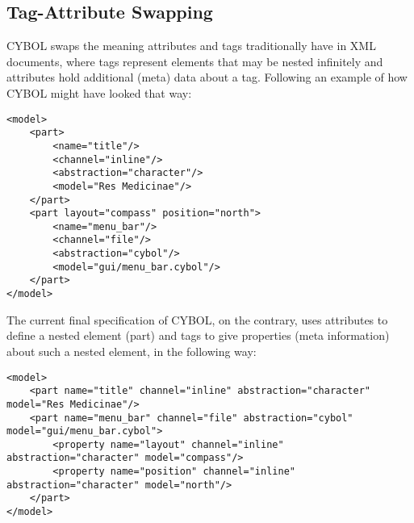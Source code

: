 %
%
%
%
%
%
%

\subsection{Tag-Attribute Swapping}
\label{tag_attribute_swapping_heading}

CYBOL swaps the meaning attributes and tags traditionally have in XML
documents, where tags represent elements that may be nested infinitely and
attributes hold additional (meta) data about a tag. Following an example of how
CYBOL might have looked that way:

\begin{scriptsize}
    \begin{verbatim}
<model>
    <part>
        <name="title"/>
        <channel="inline"/>
        <abstraction="character"/>
        <model="Res Medicinae"/>
    </part>
    <part layout="compass" position="north">
        <name="menu_bar"/>
        <channel="file"/>
        <abstraction="cybol"/>
        <model="gui/menu_bar.cybol"/>
    </part>
</model>
    \end{verbatim}
\end{scriptsize}

The current final specification of CYBOL, on the contrary, uses attributes to
define a nested element (part) and tags to give properties (meta information)
about such a nested element, in the following way:

\begin{scriptsize}
    \begin{verbatim}
<model>
    <part name="title" channel="inline" abstraction="character" model="Res Medicinae"/>
    <part name="menu_bar" channel="file" abstraction="cybol" model="gui/menu_bar.cybol">
        <property name="layout" channel="inline" abstraction="character" model="compass"/>
        <property name="position" channel="inline" abstraction="character" model="north"/>
    </part>
</model>
    \end{verbatim}
\end{scriptsize}

